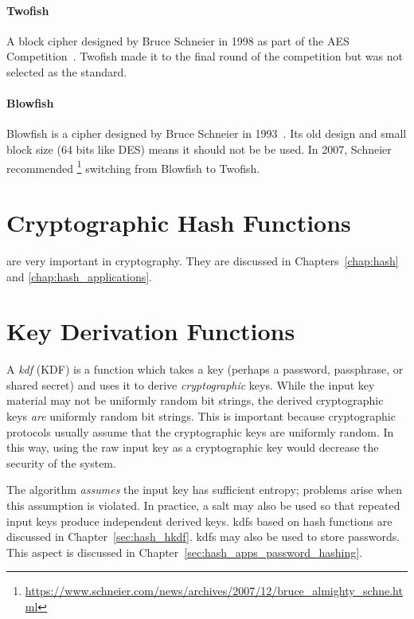 \paragraph{Twofish} A \gls{block cipher} designed by Bruce Schneier in 1998
as part of the AES Competition~\cite{TwofishAlg}.
Twofish made it to the final round of the competition
but was not selected as the standard.

\paragraph{Blowfish}
Blowfish is a cipher designed by Bruce Schneier in 1993~\cite{BlowfishAlg}.
Its old design and small block size (64 bits like DES)
means it should not be be used.
In 2007, Schneier recommended%
\footnote{\url{https://www.schneier.com/news/archives/2007/12/bruce_almighty_schne.html}}
switching from Blowfish to Twofish.


\section{Cryptographic Hash Functions}

 are very important in cryptography.
They are discussed in Chapters~\ref{chap:hash}
and \ref{chap:hash_applications}.



\section{Key Derivation Functions}
\label{sec:kdf}

A \emph{\gls{kdf}} (KDF) is a function which takes
a key (perhaps a password, passphrase, or \gls{shared secret})
and uses it to derive \emph{cryptographic} keys.
While the input key material may not be uniformly random bit strings,
the derived cryptographic keys \emph{are} uniformly random bit strings.
This is important because cryptographic protocols usually assume
that the cryptographic keys are uniformly random.
In this way, using the raw input key as a cryptographic key
would decrease the security of the system.

The algorithm \emph{assumes} the input key has sufficient entropy;
problems arise when this assumption is violated.
In practice, a \gls{salt} may also be used so that repeated
input keys produce independent derived keys.
\Glspl{kdf} based on \glspl{hash function} are discussed
in Chapter~\ref{sec:hash_hkdf}.
\Glspl{kdf} may also be used to store passwords.
This aspect is discussed in
Chapter~\ref{sec:hash_apps_password_hashing}.



